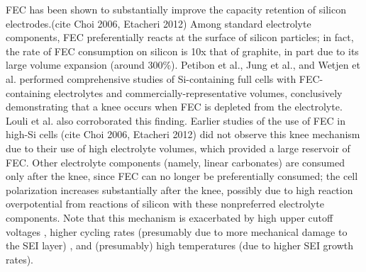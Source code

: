 \documentclass{article}
\begin{document}
FEC has been shown to substantially improve the capacity retention of silicon electrodes.(cite Choi 2006, Etacheri 2012)
Among standard electrolyte components, FEC preferentially reacts at the surface of silicon particles; in fact, the rate of FEC consumption on silicon is 10x that of graphite, in part due to its large volume expansion (around 300\%).\cite{wetjen_differentiating_2017}
Petibon et al.\cite{petibon_studies_2016},
Jung et al.\cite{jung_consumption_2016},
and Wetjen et al.\cite{wetjen_differentiating_2017}
performed comprehensive studies of Si-containing full cells with FEC-containing electrolytes and commercially-representative volumes,
conclusively demonstrating that a knee occurs when FEC is depleted from the electrolyte.
Louli et al.\cite{louli_operando_2019} also corroborated this finding.
Earlier studies of the use of FEC in high-Si cells (cite Choi 2006, Etacheri 2012) did not observe this knee mechanism due to their use of high electrolyte volumes, which provided a large reservoir of FEC.
Other electrolyte components (namely, linear carbonates) are consumed only after the knee, since FEC can no longer be preferentially consumed\cite{petibon_studies_2016}; the cell polarization increases substantially after the knee\cite{petibon_studies_2016, jung_consumption_2016, wetjen_differentiating_2017}, possibly due to high reaction overpotential from reactions of silicon with these nonpreferred electrolyte components.
Note that this mechanism is exacerbated by high upper cutoff voltages \cite{petibon_studies_2016}, higher cycling rates (presumably due to more mechanical damage to the SEI layer) \cite{petibon_studies_2016}, and (presumably) high temperatures (due to higher SEI growth rates).
\end{document}
